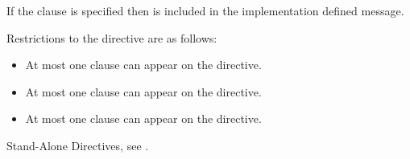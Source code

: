 If the  clause is specified then  is included 
in the implementation defined message.

\restrictions
Restrictions to the  directive are as follows:

\begin{itemize}
\item At most one  clause can appear on the directive.
\item At most one  clause can appear on the directive.
\item At most one  clause can appear on the directive.
\end{itemize}

\begin{crossrefs}
\item Stand-Alone Directives, see .
\end{crossrefs}

